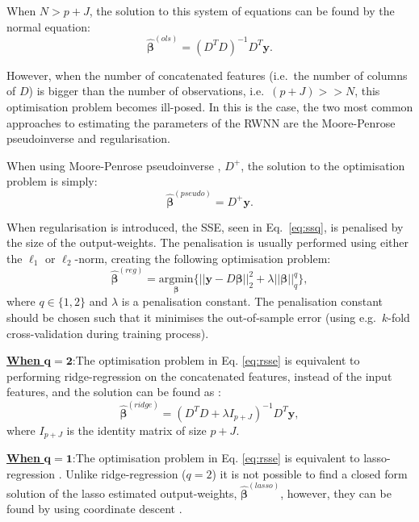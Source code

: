 \documentclass[
]{jss}
\begin{document}
When \(N > p + J\), the solution to this system of equations can be
found by the normal equation: \begin{equation}
\hat{\boldsymbol{\beta}}^{(ols)} = (D^T D)^{-1}D^T\boldsymbol{y}. \label{eq:ols}
\end{equation}

However, when the number of concatenated features (i.e.~the number of
columns of \(D\)) is bigger than the number of observations,
i.e.~\((p + J) >> N\), this optimisation problem becomes ill-posed. In
this is the case, the two most common approaches to estimating the
parameters of the RWNN are the Moore-Penrose pseudoinverse and
regularisation.

When using Moore-Penrose pseudoinverse
\citep[\citet{PenroseInv}]{BjerhammarInv}, \(D^+\), the solution to the
optimisation problem is simply: \begin{equation}
\hat{\boldsymbol \beta}^{(pseudo)} = D^+ \boldsymbol y.
\end{equation}

When regularisation is introduced, the SSE, seen in Eq.~\eqref{eq:ssq},
is penalised by the size of the output-weights. The penalisation is
usually performed using either the \(\ell_1\) or \(\ell_2\)-norm,
creating the following optimisation problem: \begin{equation}
\hat{\boldsymbol{\beta}}^{(reg)} = \underset{\boldsymbol{\beta}}{\text{argmin}} \Big\{ || \boldsymbol{y} - D\boldsymbol{\beta}||_2^2  + \lambda||\boldsymbol{\beta}||_q^q \Big\}, \label{eq:rsse}
\end{equation} where \(q \in \{1, 2\}\) and \(\lambda\) is a
penalisation constant. The penalisation constant should be chosen such
that it minimises the out-of-sample error (using e.g.~\(k\)-fold
cross-validation during training process).

\underline{\textbf{When} $\boldsymbol{q = 2}$}:\newline The optimisation
problem in Eq. \eqref{eq:rsse} is equivalent to performing
ridge-regression on the concatenated features, instead of the input
features, and the solution can be found as \citep{ridgeReg}:
\begin{equation}
\hat{\boldsymbol \beta}^{(ridge)} = \left(D^TD + \lambda I_{p + J}\right)^{-1}D^T\boldsymbol y,
\end{equation} where \(I_{p+J}\) is the identity matrix of size \(p+J\).

\underline{\textbf{When} $\boldsymbol{q = 1}$}:\newline The optimisation
problem in Eq. \eqref{eq:rsse} is equivalent to lasso-regression
\citep[\citet{TibLasso}]{SanLasso}. Unlike ridge-regression (\(q = 2\))
it is not possible to find a closed form solution of the lasso estimated
output-weights, \(\hat{\boldsymbol{\beta}}^{(lasso)}\), however, they
can be found by using coordinate descent \citep{CoordLasso}.
\end{document}
